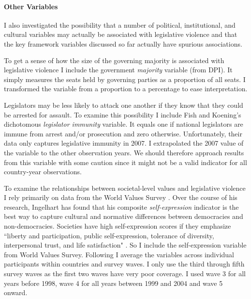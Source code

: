 \documentclass[a4paper]{article}\usepackage{graphicx, color}
\begin{document}
\paragraph{Other Variables}

I also investigated the possibility that a number of political, institutional, and cultural variables may actually be associated with legislative violence and that the key framework variables discussed so far actually have spurious associations. 

To get a sense of how the size of the governing majority is associated with legislative violence I include the government {\emph{majority}} variable (from DPI). It simply measures the seats held by governing parties as a proportion of all seats. I transformed the variable from a proportion to a percentage to ease interpretation. 

Legislators may be less likely to attack one another if they know that they could be arrested for assault. To examine this possibility I include Fish and Koening's \citeyearpar{Fish2009} dichotomous \emph{legislator immunity} variable. It equals one if national legislators are immune from arrest and/or prosecution and zero otherwise. Unfortunately, their data only captures legislative immunity in 2007. I extrapolated the 2007 value of the variable to the other observation years. We should therefore approach results from this variable with some caution since it might not be a valid indicator for all country-year observations.

To examine the relationships between societal-level values and legislative violence I rely primarily on data from the World Values Survey \citep{WVS2009}. Over the course of his research, Ingelhart has found that his composite {\emph{self-expression}} indicator is the best way to capture cultural and normative differences between democracies and non-democracies. Societies have high self-expression scores if they emphasize ``liberty and participation, public self-expression, tolerance of diversity, interpersonal trust, and life satisfaction" \citep[64]{Inglehart2003}. So I include the self-expression variable from World Values Survey. Following \cite{Inglehart2003} I average the variables across individual participants within countries and survey waves. I only use the third through fifth survey waves as the first two waves have very poor coverage. I used wave 3 for all years before 1998, wave 4 for all years between 1999 and 2004 and wave 5 onward. 
\end{document}
